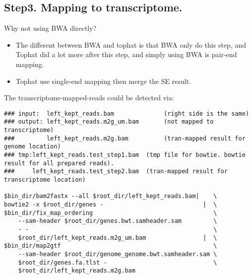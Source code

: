 \subsection{ Step3. Mapping to transcriptome.}
\begin{frame}[c,fragile]
	\begin{block}{ Why not using BWA directly? }
		\begin{itemize}
			\item The different between BWA and tophat is that BWA only do this step, and Tophat did a lot more after this step, and simply using BWA is pair-end mapping.\\ \pause
			\item Tophat use \alert{single-end} mapping then merge the SE result.
		\end{itemize}
	\end{block}
\end{frame}
\begin{frame}[c,fragile]
	\begin{block}{ The \alert{transcriptome-mapped-reads} could be detected via: }
		\begin{lstlisting}[basicstyle=\tiny]
### input:  left_kept_reads.bam              (right side is the same)
### output: left_kept_reads.m2g_um.bam       (not mapped to transcriptome)
###         left_kept_reads.m2g.bam          (tran-mapped result for genome location)
### tmp:left_kept_reads.test_step1.bam	(tmp file for bowtie. bowtie result for all prepared reads).
###     left_kept_reads.test_step2.bam	(tran-mapped result for transcriptome location)

$bin_dir/bam2fastx --all $root_dir/left_kept_reads.bam|    \
bowtie2 -x $root_dir/genes -                            |  \
$bin_dir/fix_map_ordering                                  \
    --sam-header $root_dir/genes.bwt.samheader.sam         \
    - -                                                    \
    $root_dir/left_kept_reads.m2g_um.bam                |  \
$bin_dir/map2gtf                                           \
    --sam-header $root_dir/genome_genome.bwt.samheader.sam \
    $root_dir/genes.fa.tlst -                              \
    $root_dir/left_kept_reads.m2g.bam
		\end{lstlisting}
	\end{block}
\end{frame}






